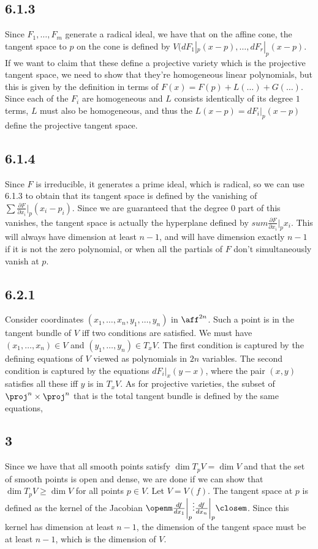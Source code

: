 \documentclass{article}
\begin{document}
\subsection*{6.1.3}
Since $F_1,\ldots,F_m$ generate a radical ideal, we have that on the affine cone, the tangent space to $p$ on the cone is defined by $V(dF_1|_p(x-p),\ldots,dF_r|_p(x-p)$. If we want to claim that these define a projective variety which is the projective tangent space, we need to show that they're homogeneous linear polynomials, but this is given by the definition in terms of $F(x)=F(p)+L(\ldots)+G(\ldots)$. Since each of the $F_i$ are homogeneous and $L$ consists identically of its degree $1$ terms, $L$ must also be homogeneous, and thus the $L(x-p)=dF_i|_p(x-p)$ define the projective tangent space.
\subsection*{6.1.4}
Since $F$ is irreducible, it generates a prime ideal, which is radical, so we can use 6.1.3 to obtain that its tangent space is defined by the vanishing of $\sum\frac{\partial F}{\partial x_i}\Big|_p(x_i-p_i)$. Since we are guaranteed that the degree $0$ part of this vanishes, the tangent space is actually the hyperplane defined by $sum\frac{\partial F}{\partial x_i}\Big|_px_i$. This will always have dimension at least $n-1$, and will have dimension exactly $n-1$ if it is not the zero polynomial, or when all the partials of $F$ don't simultaneously vanish at $p$.
\subsection*{6.2.1}
Consider coordinates $(x_1,\ldots,x_n,y_1,\ldots,y_n)$ in $\aff^{2n}$. Such a point is in the tangent bundle of $V$ iff two conditions are satisfied. We must have $(x_1,\ldots,x_n)\in V$ and $(y_1,\ldots,y_n)\in T_xV$. The first condition is captured by the defining equations of $V$ viewed as polynomials in $2n$ variables. The second condition is captured by the equations $dF_i|_x(y-x)$, where the pair $(x,y)$ satisfies all these iff $y$ is in $T_xV$. As for projective varieties, the subset of $\proj^n\times\proj^n$ that is the total tangent bundle is defined by the same equations,
\subsection*{3}
Since we have that all smooth points satisfy $\dim T_pV=\dim V$ and that the set of smooth points is open and dense, we are done if we can show that $\dim T_pV\geq\dim V$ for all points $p\in V$. Let $V=V(f)$. The tangent space at $p$ is defined as the kernel of the Jacobian $\openm\frac{df}{dx_1}\bigg|_p\\\vdots\\\frac{df}{dx_n}\bigg|_p\closem$. Since this kernel has dimension at least $n-1$, the dimension of the tangent space must be at least $n-1$, which is the dimension of $V$.
\end{document}

